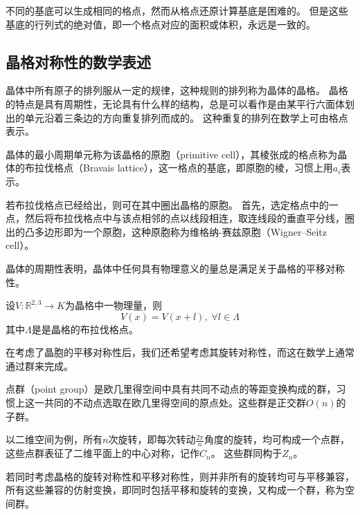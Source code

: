 不同的基底可以生成相同的格点，然而从格点还原计算基底是困难的。
但是这些基底的行列式的绝对值，即一个格点对应的面积或体积，永远是一致的。

\subsection{晶格对称性的数学表述}

晶体中所有原子的排列服从一定的规律，这种规则的排列称为晶体的晶格。
晶格的特点是具有周期性，无论具有什么样的结构，总是可以看作是由某平行六面体划出的单元沿着三条边的方向重复排列而成的。
这种重复的排列在数学上可由格点表示。

\begin{definition}
    晶体的最小周期单元称为该晶格的原胞（primitive cell），其棱张成的格点称为晶体的布拉伐格点（Bravais lattice），这一格点的基底，即原胞的棱，习惯上用$a_i$表示。
\end{definition}

若布拉伐格点已经给出，则可在其中圈出晶格的原胞。
首先，选定格点中的一点，然后将布拉伐格点中与该点相邻的点以线段相连，取连线段的垂直平分线，圈出的凸多边形即为一个原胞，这种原胞称为维格纳-赛兹原胞（Wigner–Seitz cell）。

晶体的周期性表明，晶体中任何具有物理意义的量总是满足关于晶格的平移对称性。

\begin{proposition}
    设$V: \mathbb R^{2,3} \to K$为晶格中一物理量，则
    \begin{equation}V(x) = V(x + l), \; \forall l \in \Lambda\end{equation}
    其中$\Lambda$是是晶格的布拉伐格点。
\end{proposition}

在考虑了晶胞的平移对称性后，我们还希望考虑其旋转对称性，而这在数学上通常通过群来完成。

\begin{definition}
    点群（point group）是欧几里得空间中具有共同不动点的等距变换构成的群，习惯上这一共同的不动点选取在欧几里得空间的原点处。这些群是正交群$O(n)$的子群。
\end{definition}

以二维空间为例，所有$n$次旋转，即每次转动$\frac{2\pi}{n}$角度的旋转，均可构成一个点群，这些点群表征了二维平面上的中心对称，记作$C_n$。
这些群同构于$Z_n$。

若同时考虑晶格的旋转对称性和平移对称性，则并非所有的旋转均可与平移兼容，所有这些兼容的仿射变换，即同时包括平移和旋转的变换，又构成一个群，称为空间群。

